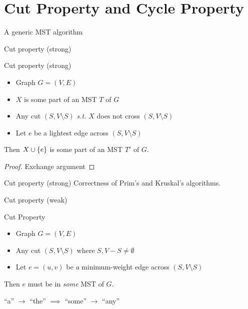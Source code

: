 \section{Cut Property and Cycle Property}

\begin{frame}{A generic MST algorithm}
\end{frame}
\begin{frame}{Cut property (strong)}
  \begin{exampleblock}{Cut property (strong)}
	\begin{itemize}
	  \item Graph $G = (V, E)$
	  \item $X$ is some part of an MST $T$ of $G$
	  \item Any cut $(S, V \setminus S)$ \emph{s.t.} $X$ does not cross $(S, V \setminus S)$
	 ­\item Let $e$ be a lightest edge across $(S, V \setminus S)$
	\end{itemize}
	Then $X \cup \{e\}$ is some part of an MST $T'$ of $G$.
  \end{exampleblock}

  \begin{proof}
	\centerline{Exchange argument}
  \end{proof}
\end{frame}
\begin{frame}{Cut property (strong)}
  Correctness of Prim's and Kruskal's algorithms.
\end{frame}
\begin{frame}{Cut property (weak)}
  \begin{exampleblock}{Cut Property }
    \begin{itemize}
	  \item Graph $G = (V, E)$
	  \item Any cut $(S, V \setminus S)$ where $S, V-S \neq \emptyset$
	  \item Let $e = (u,v)$ be \emph{a} minimum-weight edge across $(S, V \setminus S)$
	\end{itemize}
	Then $e$ must be in \emph{some} MST of $G$.
  \end{exampleblock}

  \begin{center}
	``a'' $\to$ ``the'' $\implies$ ``some'' $\to$ ``any''
  \end{center}
\end{frame}
